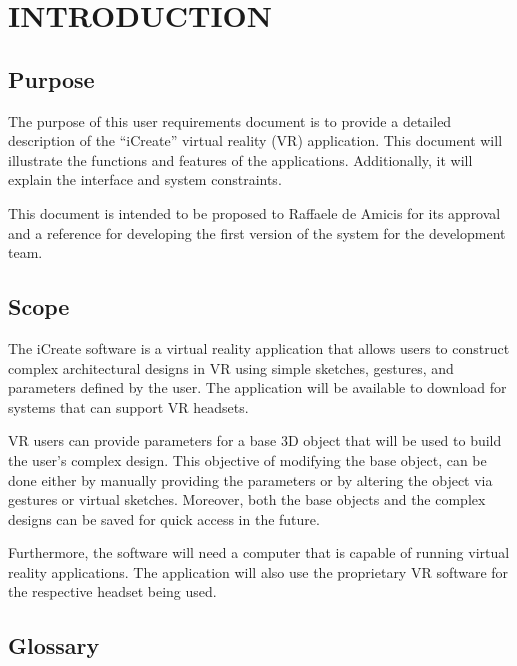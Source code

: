 \documentclass[letterpaper,draftclsnofoot,onecolumn,10 pt,compsoc]{IEEEtran}
\begin{document}
\tableofcontents

\newpage

\section{INTRODUCTION}
\subsection{Purpose}

The purpose of this user requirements document is to provide a detailed description of the “iCreate” virtual reality (VR) application. This document will illustrate the functions and features of the applications. Additionally, it will explain the interface and system constraints.
\newline

\noindent This document is intended to be proposed to Raffaele de Amicis for its approval and a reference for developing the first version of the system for the development team. 

\subsection{Scope}

The iCreate software is a virtual reality application that allows users to construct complex architectural designs in VR using simple sketches, gestures, and parameters defined by the user. The application will be available to download for systems that can support VR headsets.
\newline

\noindent VR users can provide parameters for a base 3D object that will be used to build the user’s complex design. This objective of modifying the base object, can be done either by manually providing the parameters or by altering the object via gestures or virtual sketches. Moreover, both the base objects and the complex designs can be saved for quick access in the future.
\newline

\noindent Furthermore, the software will need a computer that is capable of running virtual reality applications. The application will also use the proprietary VR software for the respective headset being used.


\subsection{Glossary}
\end{document}
